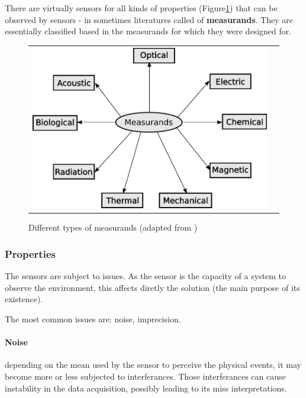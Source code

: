There are virtually sensors for all kinds of properties (Figure\ref{fig:sensors}) that can be observed by sensors - in sometimes literatures called of \textbf{measurands}. They are essentially classified based in the measurands for which they were designed for.

\begin{figure}[h]
   \centering
     \begin{tabular}{lr}
       \includegraphics[scale=0.50]{img/fig:sensors}
     \end{tabular}
   \caption{Different types of measurands (adapted from \cite{WhiteRichard})}
   \label{fig:sensors}
 \end{figure}

\subsubsection{Properties}

The sensors are subject to issues. As the sensor is the capacity of a system to observe the environment, this affects diretly the solution (the main purpose of its existence).

The most common issues are: noise, imprecision. 

\paragraph{Noise} depending on the mean used by the sensor to perceive the physical events, it may become more or less subjected to interferances. Those interferances can cause instability in the data acquisition, possibly leading to its miss interpretations.

